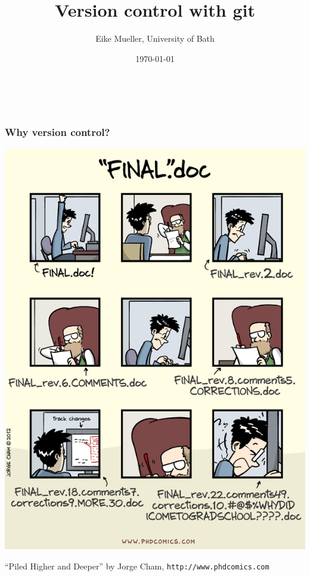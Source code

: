 \documentclass{beamer}
\begin{document}
\title{Version control with git}
\author{Eike Mueller, University of Bath}
\date{\today} 


\begin{frame}
  \frametitle{$ $}
  \titlepage
\end{frame}


\begin{frame}
  \frametitle{Why version control?}
  \begin{center}
    \includegraphics[width=0.5\linewidth]{phdcomics.png}
  \end{center}
  {\footnotesize ``Piled Higher and Deeper'' by Jorge Cham, \texttt{http://www.phdcomics.com}}
\end{frame}

\end{document}

